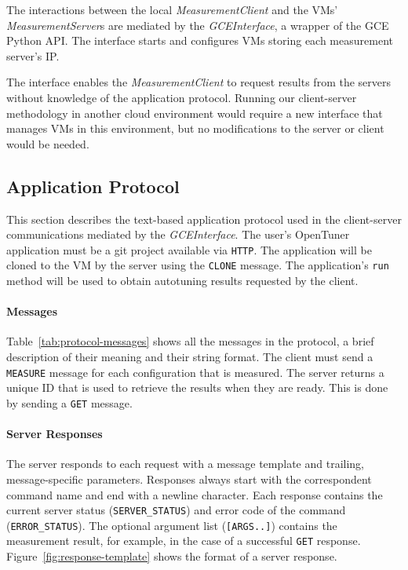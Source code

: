 The interactions between the local \emph{MeasurementClient} and the
VMs' \emph{MeasurementServer}s are mediated by the
\emph{GCEInterface}, a wrapper of the GCE Python API.
The interface starts and configures VMs 
storing each measurement server's IP.

The interface enables the \emph{MeasurementClient} to request results from
the servers without knowledge of the application protocol. Running our
client-server methodology in another cloud environment would require a
new interface that manages VMs in this environment, but no
modifications to the server or client would be needed.

\subsection{Application Protocol}
\label{sec:app}

This section describes the text-based application protocol used in the
client-server communications mediated by the \emph{GCEInterface}. The user's
OpenTuner application must be a git project available via
\texttt{\footnotesize{HTTP}}. The application will be cloned to the VM by the server using the \texttt{\footnotesize CLONE} message.  The
application's \texttt{\footnotesize run} method will be used to obtain
autotuning results requested by the client.

\paragraph{Messages}


Table~\ref{tab:protocol-messages} shows all the messages in the protocol,
a brief description of their meaning and their string format. The client
must send a \texttt{\footnotesize MEASURE} message for each configuration
that is measured. The server returns a unique ID that is used to retrieve
the results when they are ready. This is done by sending a
\texttt{\footnotesize GET} message.

\paragraph{Server Responses}

The server responds to each request with a message template and
trailing, message-specific parameters. Responses always start
with the correspondent command name and end with a newline character.
Each response contains the current server status (\texttt{\footnotesize SERVER\_STATUS})
and error code of the command (\texttt{\footnotesize ERROR\_STATUS}).
The optional argument list (\texttt{\footnotesize [ARGS..]}) contains the
measurement result, for example, in the case of a successful
\texttt{\footnotesize GET} response. Figure~\ref{fig:response-template}
shows the format of a server response.

